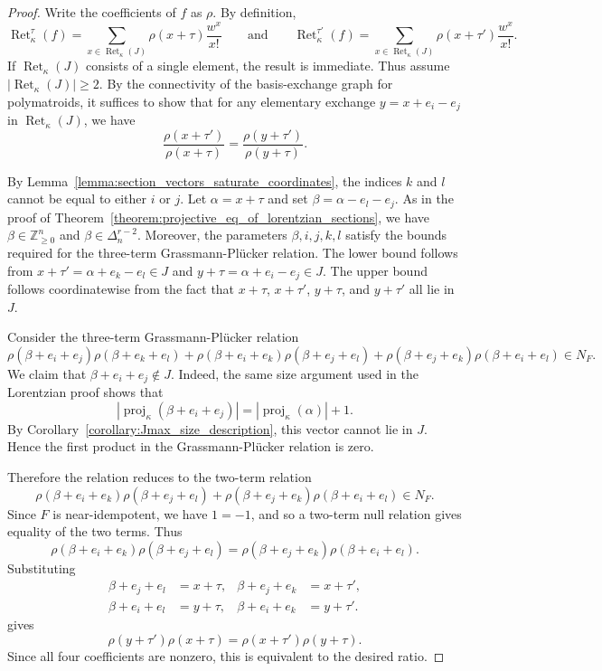 \documentclass[11pt]{article}
\theoremstyle{definition}
\theoremstyle{remark}
\newcommand{\Zgeqn}{\mathbb{Z}_{\geq 0}^n}     %
\DeclareMathOperator{\proj}{proj}              %
\newcommand{\kproj}{\proj_{\kappa}}            %
\DeclareMathOperator{\Ret}{Ret}                %
\newcommand{\RetK}{\Ret_{\kappa}}              %
\begin{document}
\begin{proof}
    Write the coefficients of $f$ as $\rho$. By definition,
    \[
        \RetK^\tau(f)
        =
        \sum_{x\in\RetK(J)}
        \rho(x+\tau)\frac{w^x}{x!}
        \qquad\text{and}\qquad
        \RetK^{\tau'}(f)
        =
        \sum_{x\in\RetK(J)}
        \rho(x+\tau')\frac{w^x}{x!}.
    \]
    If $\RetK(J)$ consists of a single element, the result is immediate. Thus assume $|\RetK(J)|\geq 2$. By the connectivity of the basis-exchange graph for polymatroids, it suffices to show that for any elementary exchange $y=x+e_i-e_j$ in $\RetK(J)$, we have
    \[
        \frac{\rho(x+\tau')}{\rho(x+\tau)}
        =
        \frac{\rho(y+\tau')}{\rho(y+\tau)}.
    \]

    By Lemma~\ref{lemma:section_vectors_saturate_coordinates}, the indices $k$ and $l$ cannot be equal to either $i$ or $j$. Let $\alpha=x+\tau$ and set $\beta=\alpha-e_l-e_j$. As in the proof of Theorem~\ref{theorem:projective_eq_of_lorentzian_sections}, we have $\beta\in\Zgeqn$ and $\beta\in\Delta_n^{r-2}$. Moreover, the parameters $\beta,i,j,k,l$ satisfy the bounds required for the three-term Grassmann-Pl\"ucker relation. The lower bound follows from $x+\tau'=\alpha+e_k-e_l\in J$ and $y+\tau=\alpha+e_i-e_j\in J$. The upper bound follows coordinatewise from the fact that $x+\tau$, $x+\tau'$, $y+\tau$, and $y+\tau'$ all lie in $J$.

    Consider the three-term Grassmann-Pl\"ucker relation
    \[
        \rho(\beta+e_i+e_j)\rho(\beta+e_k+e_l)
        +
        \rho(\beta+e_i+e_k)\rho(\beta+e_j+e_l)
        +
        \rho(\beta+e_j+e_k)\rho(\beta+e_i+e_l)
        \in N_F.
    \]
    We claim that $\beta+e_i+e_j\notin J$. Indeed, the same size argument used in the Lorentzian proof shows that
    \[
        |\kproj(\beta+e_i+e_j)|
        =
        |\kproj(\alpha)|+1.
    \]
    By Corollary~\ref{corollary:Jmax_size_description}, this vector cannot lie in $J$. Hence the first product in the Grassmann-Pl\"ucker relation is zero.

    Therefore the relation reduces to the two-term relation
    \[
        \rho(\beta+e_i+e_k)\rho(\beta+e_j+e_l)
        +
        \rho(\beta+e_j+e_k)\rho(\beta+e_i+e_l)
        \in N_F.
    \]
    Since $F$ is near-idempotent, we have $1=-1$, and so a two-term null relation gives equality of the two terms. Thus
    \[
        \rho(\beta+e_i+e_k)\rho(\beta+e_j+e_l)
        =
        \rho(\beta+e_j+e_k)\rho(\beta+e_i+e_l).
    \]
    Substituting
    \[
    \begin{aligned}
        \beta+e_j+e_l &= x+\tau, &
        \beta+e_j+e_k &= x+\tau',\\
        \beta+e_i+e_l &= y+\tau, &
        \beta+e_i+e_k &= y+\tau'.
    \end{aligned}
    \]
    gives
    \[
        \rho(y+\tau')\rho(x+\tau)
        =
        \rho(x+\tau')\rho(y+\tau).
    \]
    Since all four coefficients are nonzero, this is equivalent to the desired ratio.
\end{proof}
\end{document}

